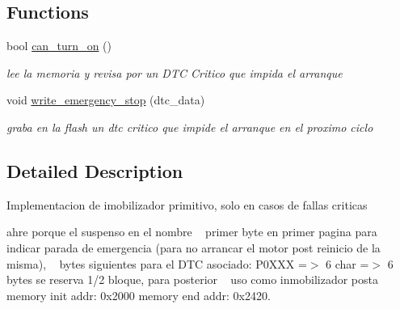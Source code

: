 \subsection*{Functions}
\begin{DoxyCompactItemize}
\item 
\mbox{\label{group__Immobilizer_gadf0449a4f1aad1229c667f356ebadadc}} 
bool \hyperlink{group__Immobilizer_gadf0449a4f1aad1229c667f356ebadadc}{can\+\_\+turn\+\_\+on} ()
\begin{DoxyCompactList}\small\item\em lee la memoria y revisa por un D\+TC Critico que impida el arranque \end{DoxyCompactList}\item 
\mbox{\label{group__Immobilizer_gab56ecb07b9fac9a85ea8dc451f3bb612}} 
void \hyperlink{group__Immobilizer_gab56ecb07b9fac9a85ea8dc451f3bb612}{write\+\_\+emergency\+\_\+stop} (dtc\+\_\+data)
\begin{DoxyCompactList}\small\item\em graba en la flash un dtc critico que impide el arranque en el proximo ciclo \end{DoxyCompactList}\end{DoxyCompactItemize}


\subsection{Detailed Description}
Implementacion de imobilizador primitivo, solo en casos de fallas criticas 

ahre porque el suspenso en el nombre ~\newline
primer byte en primer pagina para indicar parada de emergencia (para no arrancar el motor post reinicio de la misma), ~ bytes siguientes para el D\+TC asociado\+: P0\+X\+XX =$>$ 6 char =$>$ 6 bytes se reserva 1/2 bloque, para posterior ~\newline
 uso como inmobilizador posta memory init addr\+: 0x2000 memory end addr\+: 0x2420. 


